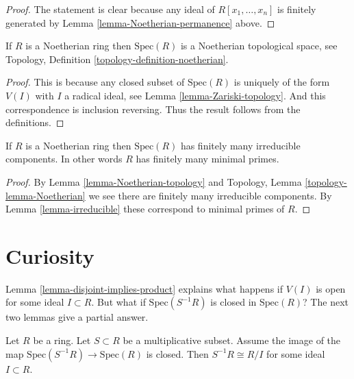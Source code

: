 \begin{proof}
The statement is clear because any ideal of
$R[x_1, \ldots, x_n]$ is finitely generated by Lemma
\ref{lemma-Noetherian-permanence} above.
\end{proof}

\begin{lemma}
\label{lemma-Noetherian-topology}
If $R$ is a Noetherian ring then $\text{Spec}(R)$
is a Noetherian topological space, see Topology,
Definition \ref{topology-definition-noetherian}.
\end{lemma}

\begin{proof}
This is because any closed subset of $\text{Spec}(R)$
is uniquely of the form $V(I)$ with $I$ a radical ideal,
see Lemma \ref{lemma-Zariski-topology}.
And this correspondence is inclusion reversing.
Thus the result follows from the definitions.
\end{proof}

\begin{lemma}
\label{lemma-Noetherian-irreducible-components}
If $R$ is a Noetherian ring then $\text{Spec}(R)$
has finitely many irreducible components. In other words
$R$ has finitely many minimal primes.
\end{lemma}

\begin{proof}
By Lemma \ref{lemma-Noetherian-topology} and
Topology, Lemma \ref{topology-lemma-Noetherian}
we see there are finitely many irreducible components.
By Lemma \ref{lemma-irreducible} these correspond to
minimal primes of $R$.
\end{proof}







\section{Curiosity}
\label{section-curiosity}

\noindent
Lemma \ref{lemma-disjoint-implies-product}
explains what happens if $V(I)$ is open for some ideal $I \subset R$.
But what if $\text{Spec}(S^{-1}R)$ is closed in $\text{Spec}(R)$?
The next two lemmas give a partial answer.

\begin{lemma}
\label{lemma-invert-closed-quotient}
Let $R$ be a ring. Let $S \subset R$ be a multiplicative subset.
Assume the image of the map $\text{Spec}(S^{-1}R) \to \text{Spec}(R)$
is closed. Then $S^{-1}R \cong R/I$ for some ideal $I \subset R$.
\end{lemma}

